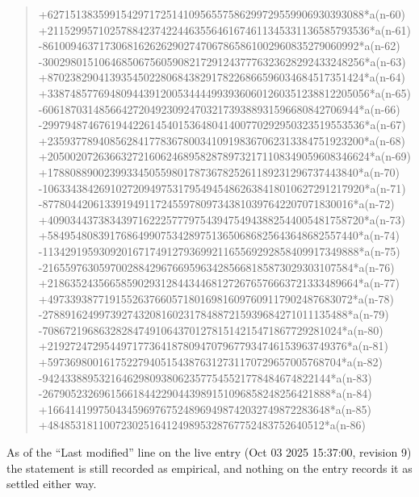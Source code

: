 \documentclass[11pt,a4paper]{article}
\theoremstyle{plain}
\theoremstyle{definition}
\begin{document}
\begin{quote}
+62715138359915429717251410956557586299729559906930393088*a(n-60) +211529957102578842374224463556461674611345331136585793536*a(n-61) -86100946371730681626262902747067865861002960835279060992*a(n-62) -300298015106468506756059082172912437776323628292433248256*a(n-63) +87023829041393545022806843829178226866596034684517351424*a(n-64) +338748577694809443912005344449939360601260351238812205056*a(n-65) -60618703148566427204923092470321739388931596680842706944*a(n-66) -299794874676194422614540153648041400770292950323519553536*a(n-67) +23593778940856284177836780034109198367062313384751923200*a(n-68) +205002072636632721606246895828789732171108349059608346624*a(n-69) +1788088900239933450559801787367825261189231296737443840*a(n-70) -106334384269102720949753179549454862638418010627291217920*a(n-71) -8778044206133919491172455978097343810397642207071830016*a(n-72) +40903443738343971622257779754394754943882544005481758720*a(n-73) +5849548083917686499075342897513650686825643648682557440*a(n-74) -11342919593092016717491279369921165569292858409917349888*a(n-75) -2165597630597002884296766959634285668185873029303107584*a(n-76) +2186352435665859029312844344681272676576663721333489664*a(n-77) +497339387719155263766057180169816097609117902487683072*a(n-78) -278891624997392743208160231784887215939684271011135488*a(n-79) -70867219686328284749106437012781514215471867729281024*a(n-80) +21927247295449717736418780947079677934746153963749376*a(n-81) +5973698001617522794051543876312731170729657005768704*a(n-82) -942433889532164629809380623577545521778484674822144*a(n-83) -267905232696156618442290443989151096858248256421888*a(n-84) +16641419975043459697675248969498742032749872283648*a(n-85) +4848531811007230251641249895328767752483752640512*a(n-86)
\end{quote}
As of the ``Last modified'' line on the live entry (Oct 03 2025 15:37:00, revision 9) the statement is
still recorded as empirical, and nothing on the entry records it as settled either way.
\end{document}
